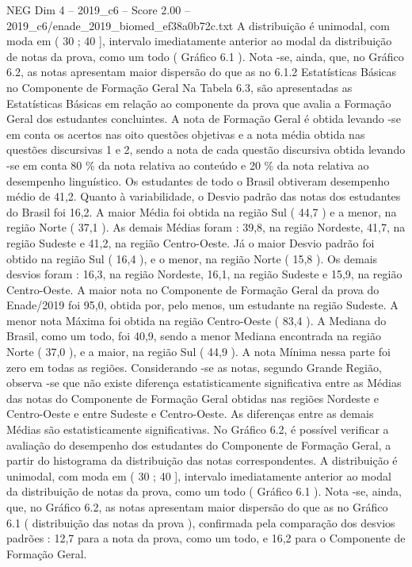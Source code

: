 \begin{textsample}{NEG Dim 4 – 2019\_c6 – Score 2.00 – 2019\_c6/enade\_2019\_biomed\_ef38a0b72c.txt}
A distribuição é unimodal, com moda em ( 30 ; 40 ], intervalo imediatamente anterior ao modal da distribuição de notas da prova, como um todo ( Gráfico 6.1 ).
Nota -se, ainda, que, no Gráfico 6.2, as notas apresentam maior dispersão do que as no 6.1.2 Estatísticas Básicas no Componente de Formação Geral Na Tabela 6.3, são apresentadas as Estatísticas Básicas em relação ao componente da prova que avalia a Formação Geral dos estudantes concluintes.
A nota de Formação Geral é obtida levando -se em conta os acertos nas oito questões objetivas e a nota média obtida nas questões discursivas 1 e 2, sendo a nota de cada questão discursiva obtida levando -se em conta 80 \% da nota relativa ao conteúdo e 20 \% da nota relativa ao desempenho linguístico.
Os estudantes de todo o Brasil obtiveram desempenho médio de 41,2.
Quanto à variabilidade, o Desvio padrão das notas dos estudantes do Brasil foi 16,2.
A maior Média foi obtida na região Sul ( 44,7 ) e a menor, na região Norte ( 37,1 ).
As demais Médias foram : 39,8, na região Nordeste, 41,7, na região Sudeste e 41,2, na região Centro-Oeste.
Já o maior Desvio padrão foi obtido na região Sul ( 16,4 ), e o menor, na região Norte ( 15,8 ).
Os demais desvios foram : 16,3, na região Nordeste, 16,1, na região Sudeste e 15,9, na região Centro-Oeste.
A maior nota no Componente de Formação Geral da prova do Enade/2019 foi 95,0, obtida por, pelo menos, um estudante na região Sudeste.
A menor nota Máxima foi obtida na região Centro-Oeste ( 83,4 ).
A Mediana do Brasil, como um todo, foi 40,9, sendo a menor Mediana encontrada na região Norte ( 37,0 ), e a maior, na região Sul ( 44,9 ).
A nota Mínima nessa parte foi zero em todas as regiões.
Considerando -se as notas, segundo Grande Região, observa -se que não existe diferença estatisticamente significativa entre as Médias das notas do Componente de Formação Geral obtidas nas regiões Nordeste e Centro-Oeste e entre Sudeste e Centro-Oeste.
As diferenças entre as demais Médias são estatisticamente significativas.
No Gráfico 6.2, é possível verificar a avaliação do desempenho dos estudantes do Componente de Formação Geral, a partir do histograma da distribuição das notas correspondentes.
A distribuição é unimodal, com moda em ( 30 ; 40 ], intervalo imediatamente anterior ao modal da distribuição de notas da prova, como um todo ( Gráfico 6.1 ).
Nota -se, ainda, que, no Gráfico 6.2, as notas apresentam maior dispersão do que as no Gráfico 6.1 ( distribuição das notas da prova ), confirmada pela comparação dos desvios padrões : 12,7 para a nota da prova, como um todo, e 16,2 para o Componente de Formação Geral.

\end{textsample}
